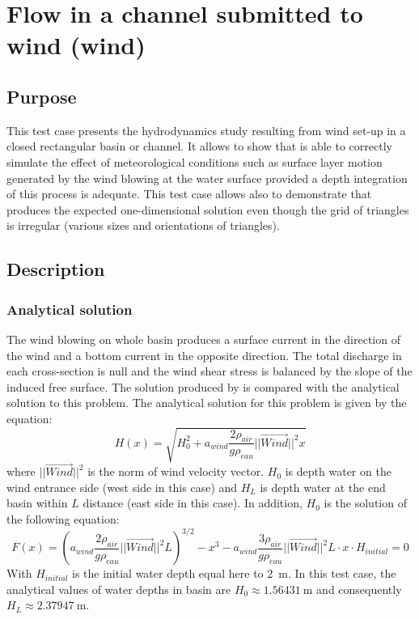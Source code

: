 \chapter{Flow in a channel submitted to wind (wind)}

\section{Purpose}

This test case presents the hydrodynamics study resulting from wind set-up in a 
closed rectangular basin or channel.
It allows to show that  is able to correctly simulate the effect 
of meteorological conditions such as surface layer motion generated by the wind blowing
at the water surface provided a depth integration of this process is adequate.
This test case allows also to demonstrate that  produces the expected
one-dimensional solution even though the grid of triangles is irregular 
(various sizes and orientations of triangles).

\section{Description}

\subsection{Analytical solution}

The wind blowing on whole basin produces a surface current in the direction of 
the wind and a bottom current in the opposite direction. The total discharge in each 
cross-section is null and the wind shear stress is balanced by the slope of the 
induced free surface. The solution produced by  is compared 
with the analytical solution to this problem. 
The analytical solution for this problem is given by the equation:
\begin{equation}
H(x)=\sqrt{H_0^2 +a_{wind}\frac{2\rho_{air}}{g\rho_{eau}}||\vec{Wind}||^{2} x}
\end{equation}
where $||\vec{Wind}||^{2}$ is the norm of wind velocity vector. $H_0$ is 
depth water on the wind entrance side (west side in this case) 
and $H_L$ is depth water at the end basin within $L$ distance (east side in this case).
In addition, $H_0$ is the solution of the following equation: 
\begin{equation}
F(x)=\left( a_{wind}\frac{2\rho_{air}}{g\rho_{eau}}||\vec{Wind}||^{2} 
L\right)^{3/2}-x^3-a_{wind}\frac{3\rho_{air}}{g\rho_{eau}}||\vec{Wind}||^{2}
L\cdot x\cdot H_{initial}=0
\end{equation}
With $H_{initial}$ is the initial water depth equal here to 2~m.
In this test case, the analytical values of water depths in basin are 
$H_0 \approx 1.56431~\text{m}$ and consequently $H_L \approx 2.37947~\text{m}$.

